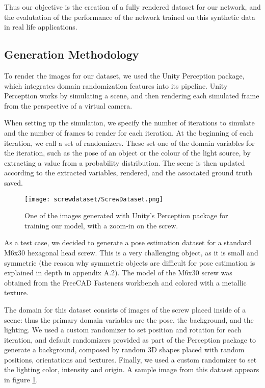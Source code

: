 Thus our objective is the creation of a fully rendered dataset for our network, and the evalutation of the performance of the network trained on this synthetic data in real life applications.

\subsection{Generation Methodology}
\label{ss:ScrewDataset}

To render the images for our dataset, we used the Unity Perception package\cite{unityPerception}, which integrates domain randomization features into its pipeline. Unity Perception works by simulating a scene, and then rendering each simulated frame from the perspective of a virtual camera. 

When setting up the simulation, we specify the number of iterations to simulate and the number of frames to render for each iteration. At the beginning of each iteration, we call a set of randomizers. These set one of the domain variables for the iteration, such as the pose of an object or the colour of the light source, by extracting a value from a probability distribution. The scene is then updated according to the extracted variables, rendered, and the associated ground truth saved.

\begin{figure}
    \centering
    \texttt{[image: screwdataset/ScrewDataset.png]}
    \caption{One of the images generated with Unity's Perception package for training our model, with a zoom-in on the screw.}
    \label{fig:screwdataset}
\end{figure}

As a test case, we decided to generate a pose estimation dataset for a standard M6x30 hexagonal head screw. This is a very challenging object, as it is small and symmetric (the reason why symmetric objects are difficult for pose estimation is explained in depth in appendix A.2). The model of the M6x30 screw was obtained from the FreeCAD Fasteners workbench\cite{Fasteners} and colored with a metallic texture.

The domain for this dataset consists of images of the screw placed inside of a scene: thus the primary domain variables are the pose, the background, and the lighting. We used a custom randomizer to set position and rotation for each iteration, and default randomizers provided as part of the Perception package to generate a background, composed by random 3D shapes placed with random positions, orientations and textures. Finally, we used a custom randomizer to set the lighting color, intensity and origin. A sample image from this dataset appears in figure \ref{fig:screwdataset}.

